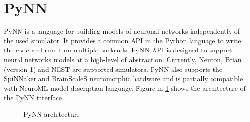 \section{PyNN}
PyNN is a language for building models of neuronal networks independently of the used simulator. It provides a common API in the Python language to write the code and run it on multiple backends. PyNN API is designed to support neural networks models at a high-level of abstraction. Currently, Neuron, Brian (version 1) and NEST are supported simulators. PyNN also supports the SpiNNaker and BrainScaleS neuromorphic hardware and is partially compatible with NeuroML model description language. Figure in \cref{fig:pynn} shows the architecture of the PyNN interface \cite{bruderleNeuroscientificModelingMixedSignal2009}.

\begin{figure}[htb]
    \centering
    \begin{sideways}
        
    \end{sideways}
    \caption{PyNN architecture}
    \label{fig:pynn}
\end{figure}
